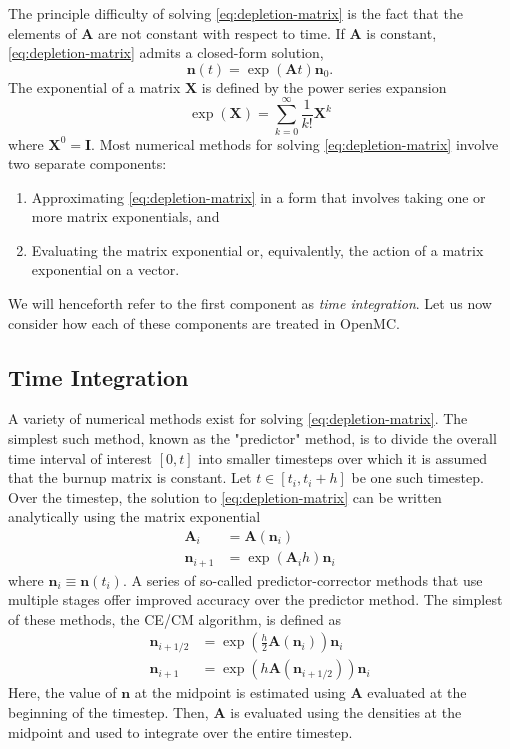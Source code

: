 \documentclass[3p,authoryear]{elsarticle}
\begin{document}
The principle difficulty of solving \cref{eq:depletion-matrix} is the fact that
the elements of $\mathbf{A}$ are not constant with respect to time. If
$\mathbf{A}$ is constant, \cref{eq:depletion-matrix} admits a closed-form
solution,
\begin{equation}
  \mathbf{n}(t) = \exp \left (\mathbf{A} t \right ) \mathbf{n}_0.
\end{equation}
The exponential of a matrix $\mathbf{X}$ is defined by the power series
expansion
\begin{equation}
    \exp(\mathbf{X}) = \sum\limits_{k=0}^\infty \frac{1}{k!} \mathbf{X}^k
\end{equation}
where $\mathbf{X}^0 = \mathbf{I}$. Most numerical methods for solving
\cref{eq:depletion-matrix} involve two separate components:
\begin{enumerate}
  \item Approximating \cref{eq:depletion-matrix} in a form that involves taking
  one or more matrix exponentials, and
  \item Evaluating the matrix exponential or, equivalently, the action of a
  matrix exponential on a vector.
\end{enumerate}
We will henceforth refer to the first component as \emph{time integration}. Let
us now consider how each of these components are treated in OpenMC.

\subsection{Time Integration}
\label{sec:time_integration}

A variety of numerical methods exist for solving \cref{eq:depletion-matrix}. The
simplest such method, known as the "predictor" method, is to divide the overall
time interval of interest $[0,t]$ into smaller timesteps over which it is
assumed that the burnup matrix is constant. Let $t \in [t_i, t_i + h]$ be one
such timestep. Over the timestep, the solution to \cref{eq:depletion-matrix} can
be written analytically using the matrix exponential
\begin{align}
    \mathbf{A}_i &= \mathbf{A}(\mathbf{n}_i) \\
    \mathbf{n}_{i+1} &= \exp(\mathbf{A}_i h) \mathbf{n}_i
\end{align}
where $\mathbf{n}_i \equiv \mathbf{n}(t_i)$. A series of so-called predictor-corrector
methods that use multiple stages offer improved accuracy over the predictor
method. The simplest of these methods, the CE/CM algorithm, is defined as
\begin{align}
    \mathbf{n}_{i+1/2} &= \exp \left (\frac{h}{2}\mathbf{A}(\mathbf{n}_i) \right) \mathbf{n}_i \\
    \mathbf{n}_{i+1} &= \exp \left(h \mathbf{A}(\mathbf{n}_{i+1/2}) \right) \mathbf{n}_i
\end{align}
Here, the value of $\mathbf{n}$ at the midpoint is estimated using
$\mathbf{A}$ evaluated at the beginning of the timestep. Then,
$\mathbf{A}$ is evaluated using the densities at the midpoint and used to
integrate over the entire timestep.
\end{document}
